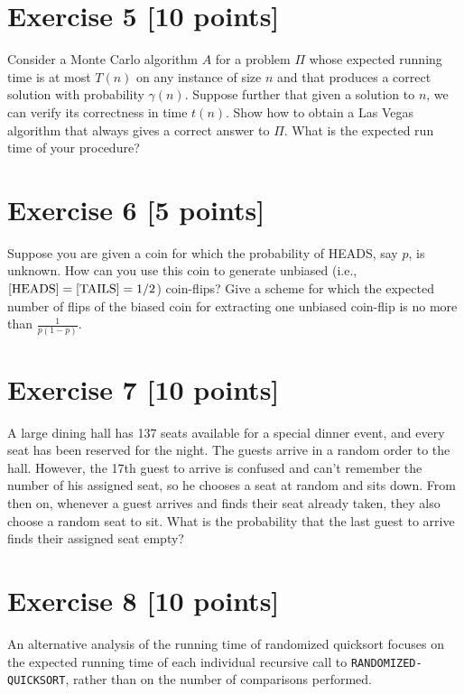 \documentclass[11pt]{article}
\let\Pr\relax
\DeclareMathOperator*{\Pr}{\mathbb{P}}
\theoremstyle{theorem}
\theoremstyle{lemma}
\theoremstyle{corollary}
\theoremstyle{definition}
\begin{document}
  \section*{Exercise 5 [10 points]} 
 
Consider a Monte Carlo algorithm \( A \) for a problem \( \Pi  \) whose expected running time is at most \( T(n) \) on any instance of size \( n \) and that produces a correct solution with probability \( \gamma(n) \). Suppose further that given a solution to \( n \), we can verify its correctness in time \( t(n) \). Show how to obtain a Las Vegas algorithm that always gives a correct answer to \( \Pi  \). What is the expected run time of your procedure?
 
\section*{Exercise 6 [5 points]} 

Suppose you are given a coin for which the probability of HEADS, say \( p \), is unknown. How can you use this coin to generate unbiased (i.e., \( \Pr[\text{HEADS}] = \Pr[\text{TAILS}] = 1/2 \)) coin-flips? Give a scheme for which the expected number of flips of the biased coin for extracting one unbiased coin-flip is no more than \( \frac{1}{p(1 - p)} \).

 \section*{Exercise  7 [10 points]} 

A large dining hall has 137 seats available for a special dinner event, and every seat has been reserved for the night. The guests arrive in a random order to the hall. However, the 17th guest to arrive is confused and can't remember the number of his assigned seat, so he chooses a seat at random and sits down. From then on, whenever a guest arrives and finds their seat already taken, they also choose a random seat to sit. What is the probability that the last guest to arrive finds their assigned seat empty?


 \section*{Exercise  8 [10 points]} 


An alternative analysis of the running time of randomized quicksort focuses on the expected running time of each individual recursive call to \texttt{RANDOMIZED-QUICKSORT}, rather than on the number of comparisons performed.
\end{document}
